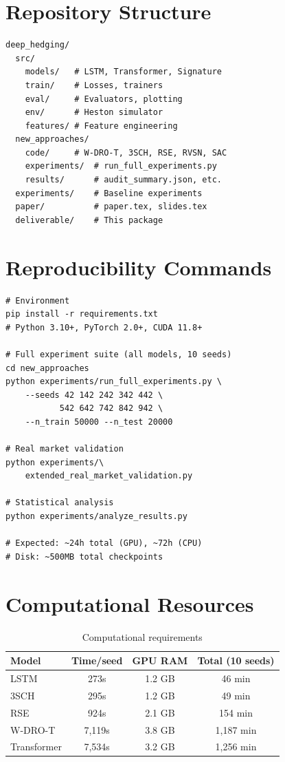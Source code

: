 \documentclass[11pt]{article}
\begin{document}
\section{Repository Structure}
\label{app:repo}

\begin{verbatim}
deep_hedging/
  src/
    models/   # LSTM, Transformer, Signature
    train/    # Losses, trainers
    eval/     # Evaluators, plotting
    env/      # Heston simulator
    features/ # Feature engineering
  new_approaches/
    code/     # W-DRO-T, 3SCH, RSE, RVSN, SAC
    experiments/  # run_full_experiments.py
    results/      # audit_summary.json, etc.
  experiments/    # Baseline experiments
  paper/          # paper.tex, slides.tex
  deliverable/    # This package
\end{verbatim}

\section{Reproducibility Commands}
\label{app:reproduce}

\begin{verbatim}
# Environment
pip install -r requirements.txt
# Python 3.10+, PyTorch 2.0+, CUDA 11.8+

# Full experiment suite (all models, 10 seeds)
cd new_approaches
python experiments/run_full_experiments.py \
    --seeds 42 142 242 342 442 \
           542 642 742 842 942 \
    --n_train 50000 --n_test 20000

# Real market validation
python experiments/\
    extended_real_market_validation.py

# Statistical analysis
python experiments/analyze_results.py

# Expected: ~24h total (GPU), ~72h (CPU)
# Disk: ~500MB total checkpoints
\end{verbatim}

\section{Computational Resources}
\label{app:compute}

\begin{table}[h]
\centering
\caption{Computational requirements}
\small
\begin{tabular}{lccc}
\toprule
\textbf{Model} & \textbf{Time/seed} & \textbf{GPU RAM} & \textbf{Total (10 seeds)} \\
\midrule
LSTM & 273s & 1.2 GB & 46 min \\
3SCH & 295s & 1.2 GB & 49 min \\
RSE & 924s & 2.1 GB & 154 min \\
W-DRO-T & 7,119s & 3.8 GB & 1,187 min \\
Transformer & 7,534s & 3.2 GB & 1,256 min \\
\bottomrule
\end{tabular}
\end{table}
\end{document}
